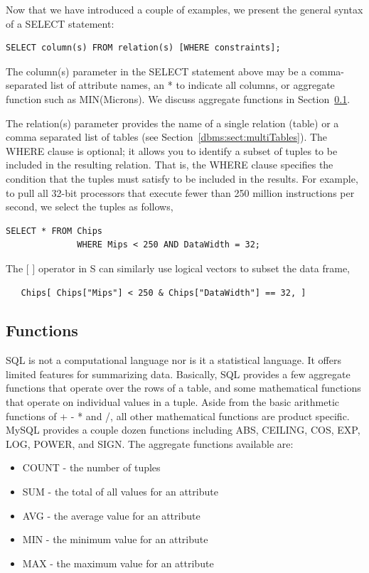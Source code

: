 Now that we have introduced a couple of examples, we present the general 
syntax of a SELECT statement:
\begin{verbatim}
SELECT column(s) FROM relation(s) [WHERE constraints];
\end{verbatim}
The column(s) parameter in the SELECT statement above may be a
comma-separated list of attribute names,
an * to indicate all columns,
or aggregate function such as MIN(Microns).
We discuss aggregate functions in Section~\ref{dbms:sect:SQLFcn}.

The relation(s) parameter provides the name of
a single relation (table) or a comma separated
list of tables (see Section~\ref{dbms:sect:multiTables}).
The WHERE clause is optional; it allows you to identify a 
subset of tuples to be included in the resulting relation.
That is, the WHERE clause specifies the condition that the tuples must 
satisfy to be included in the results. 
For example, to pull all 32-bit processors that execute fewer than
250 million instructions per second, we select the tuples as follows,
\begin{verbatim}
SELECT * FROM Chips 
              WHERE Mips < 250 AND DataWidth = 32;
\end{verbatim}
The $[$ $]$ operator in S can similarly use logical vectors to
subset the data frame,

\begin{verbatim}
   Chips[ Chips["Mips"] < 250 & Chips["DataWidth"] == 32, ]
\end{verbatim}


\subsection{Functions}\label{dbms:sect:SQLFcn}

SQL is not a computational language nor is it a statistical language.
It offers limited features for summarizing data.
Basically, SQL provides a few aggregate functions that operate over 
the rows of a table, and some mathematical functions that operate on 
individual values in a tuple.
Aside from the basic arithmetic functions of + - * and /, all other
mathematical functions are product specific.
MySQL provides a couple dozen functions including ABS, CEILING, COS,
EXP, LOG, POWER, and SIGN.
The aggregate functions available are:

\begin{itemize}
\item COUNT - the number of tuples
\item SUM -  the total of all values for an attribute
\item AVG -  the average value for an attribute
\item MIN - the minimum value for an attribute
\item MAX - the maximum value for an attribute
\end{itemize}
                                                                                
